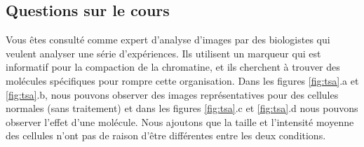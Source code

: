 \documentclass[11pt,addpoints]{exam}
\begin{document}
\begin{questions}

\section{Questions sur le cours}



\question[3] Vous êtes consulté comme expert d'analyse d'images par
des biologistes qui veulent analyser une série d'expériences. Ils
utilisent un marqueur qui est informatif pour la compaction de la
chromatine, et ils cherchent à trouver des molécules spécifiques pour
rompre cette organisation. Dans les figures \ref{fig:tsa}.a et
\ref{fig:tsa}.b, nous pouvons observer des images représentatives pour
des cellules normales (sans traitement) et dans les figures
\ref{fig:tsa}.c et \ref{fig:tsa}.d nous pouvons observer l'effet d'une
molécule. Nous ajoutons que la taille et l'intensité moyenne des
cellules n'ont pas de raison d'être différentes entre les deux
conditions. 


\end{questions}
\end{document}
